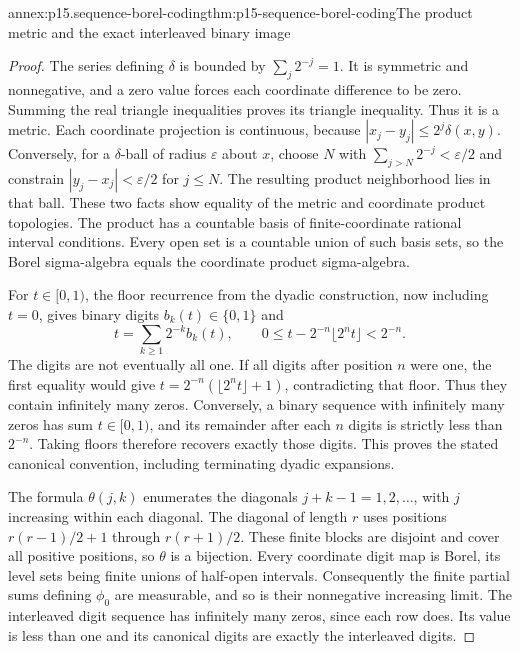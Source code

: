 \begin{annexitem}{annex:p15.sequence-borel-coding}{thm:p15-sequence-borel-coding}{The product metric and the exact interleaved binary image}
\begin{proof}
The series defining \(\delta\) is bounded by \(\sum_j2^{-j}=1\).
It is symmetric and nonnegative, and a zero value forces each
coordinate difference to be zero. Summing the real triangle
inequalities proves its triangle inequality. Thus it is a metric.
Each coordinate projection is continuous, because
\(|x_j-y_j|\leq2^j\delta(x,y)\).
Conversely, for a \(\delta\)-ball of radius \(\varepsilon\)
about \(x\), choose \(N\) with \(\sum_{j>N}2^{-j}<\varepsilon/2\)
and constrain \(|y_j-x_j|<\varepsilon/2\) for \(j\leq N\).
The resulting product neighborhood lies in that ball. These two
facts show equality of the metric and coordinate product topologies.
The product has a countable basis of finite-coordinate rational
interval conditions. Every open set is a countable union of such
basis sets, so the Borel sigma-algebra equals the coordinate
product sigma-algebra.

For \(t\in[0,1)\), the floor recurrence from the dyadic
construction, now including \(t=0\), gives binary digits
\(b_k(t)\in\{0,1\}\) and
\[
 t=\sum_{k\geq1}2^{-k}b_k(t),\qquad
 0\leq t-2^{-n}\lfloor2^nt\rfloor<2^{-n}.
\]
The digits are not eventually all one. If all digits after
position \(n\) were one, the first equality would give
\(t=2^{-n}(\lfloor2^nt\rfloor+1)\), contradicting that
floor. Thus they contain infinitely many zeros.
Conversely, a binary sequence with infinitely many zeros has
sum \(t\in[0,1)\), and its remainder after each \(n\)
digits is strictly less than \(2^{-n}\). Taking floors
therefore recovers exactly those digits. This proves the stated
canonical convention, including terminating dyadic expansions.

The formula \(\theta(j,k)\) enumerates the diagonals
\(j+k-1=1,2,\ldots\), with \(j\) increasing within
each diagonal. The diagonal of length \(r\) uses positions
\(r(r-1)/2+1\) through \(r(r+1)/2\). These finite
blocks are disjoint and cover all positive positions, so
\(\theta\) is a bijection. Every coordinate digit map is
Borel, its level sets being finite unions of half-open intervals.
Consequently the finite partial sums defining \(\phi_0\)
are measurable, and so is their nonnegative increasing limit.
The interleaved digit sequence has infinitely many zeros, since
each row does. Its value is less than one and its canonical
digits are exactly the interleaved digits.


\end{proof}
\end{annexitem}
